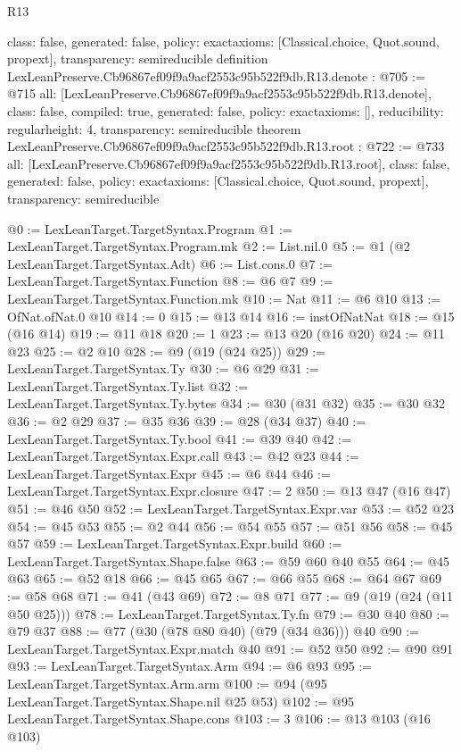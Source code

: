 \begin{lexlean}{R13}
\begin{coremodule}
{  class: false,
  generated: false,
  policy: exact{axioms: [Classical.choice, Quot.sound, propext]},
  transparency: semireducible
}
definition LexLeanPreserve.Cb96867ef09f9a9acf2553c95b522f9db.R13.denote : @705 := @715 {
  all: [LexLeanPreserve.Cb96867ef09f9a9acf2553c95b522f9db.R13.denote],
  class: false,
  compiled: true,
  generated: false,
  policy: exact{axioms: []},
  reducibility: regular{height: 4},
  transparency: semireducible
}
theorem LexLeanPreserve.Cb96867ef09f9a9acf2553c95b522f9db.R13.root : @722 := @733 {
  all: [LexLeanPreserve.Cb96867ef09f9a9acf2553c95b522f9db.R13.root],
  class: false,
  generated: false,
  policy: exact{axioms: [Classical.choice, Quot.sound, propext]},
  transparency: semireducible
}

@0 := LexLeanTarget.TargetSyntax.Program
@1 := LexLeanTarget.TargetSyntax.Program.mk
@2 := List.nil.{0}
@5 := @1 (@2 LexLeanTarget.TargetSyntax.Adt)
@6 := List.cons.{0}
@7 := LexLeanTarget.TargetSyntax.Function
@8 := @6 @7
@9 := LexLeanTarget.TargetSyntax.Function.mk
@10 := Nat
@11 := @6 @10
@13 := OfNat.ofNat.{0} @10
@14 := 0
@15 := @13 @14
@16 := instOfNatNat
@18 := @15 (@16 @14)
@19 := @11 @18
@20 := 1
@23 := @13 @20 (@16 @20)
@24 := @11 @23
@25 := @2 @10
@28 := @9 (@19 (@24 @25))
@29 := LexLeanTarget.TargetSyntax.Ty
@30 := @6 @29
@31 := LexLeanTarget.TargetSyntax.Ty.list
@32 := LexLeanTarget.TargetSyntax.Ty.bytes
@34 := @30 (@31 @32)
@35 := @30 @32
@36 := @2 @29
@37 := @35 @36
@39 := @28 (@34 @37)
@40 := LexLeanTarget.TargetSyntax.Ty.bool
@41 := @39 @40
@42 := LexLeanTarget.TargetSyntax.Expr.call
@43 := @42 @23
@44 := LexLeanTarget.TargetSyntax.Expr
@45 := @6 @44
@46 := LexLeanTarget.TargetSyntax.Expr.closure
@47 := 2
@50 := @13 @47 (@16 @47)
@51 := @46 @50
@52 := LexLeanTarget.TargetSyntax.Expr.var
@53 := @52 @23
@54 := @45 @53
@55 := @2 @44
@56 := @54 @55
@57 := @51 @56
@58 := @45 @57
@59 := LexLeanTarget.TargetSyntax.Expr.build
@60 := LexLeanTarget.TargetSyntax.Shape.false
@63 := @59 @60 @40 @55
@64 := @45 @63
@65 := @52 @18
@66 := @45 @65
@67 := @66 @55
@68 := @64 @67
@69 := @58 @68
@71 := @41 (@43 @69)
@72 := @8 @71
@77 := @9 (@19 (@24 (@11 @50 @25)))
@78 := LexLeanTarget.TargetSyntax.Ty.fn
@79 := @30 @40
@80 := @79 @37
@88 := @77 (@30 (@78 @80 @40) (@79 (@34 @36))) @40
@90 := LexLeanTarget.TargetSyntax.Expr.match @40
@91 := @52 @50
@92 := @90 @91
@93 := LexLeanTarget.TargetSyntax.Arm
@94 := @6 @93
@95 := LexLeanTarget.TargetSyntax.Arm.arm
@100 := @94 (@95 LexLeanTarget.TargetSyntax.Shape.nil @25 @53)
@102 := @95 LexLeanTarget.TargetSyntax.Shape.cons
@103 := 3
@106 := @13 @103 (@16 @103)

\end{coremodule}
\end{lexlean}
